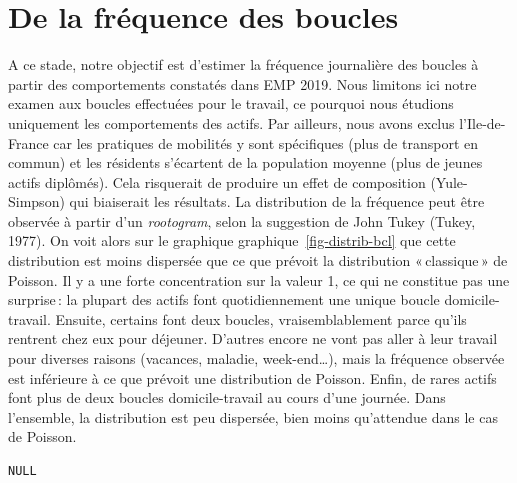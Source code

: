 \documentclass[
  9pt,
  a4paper,
  DIV=11]{scrreprt}
\begin{document}
\section{De la fréquence des
boucles}\label{de-la-fruxe9quence-des-boucles}

A ce stade, notre objectif est d'estimer la fréquence journalière des
boucles à partir des comportements constatés dans EMP 2019. Nous
limitons ici notre examen aux boucles effectuées pour le travail, ce
pourquoi nous étudions uniquement les comportements des actifs. Par
ailleurs, nous avons exclus l'Ile-de-France car les pratiques de
mobilités y sont spécifiques (plus de transport en commun) et les
résidents s'écartent de la population moyenne (plus de jeunes actifs
diplômés). Cela risquerait de produire un effet de composition
(Yule-Simpson) qui biaiserait les résultats. La distribution de la
fréquence peut être observée à partir d'un \emph{rootogram}, selon la
suggestion de John Tukey (Tukey, 1977). On voit alors sur le graphique
graphique~\ref{fig-distrib-bcl} que cette distribution est moins
dispersée que ce que prévoit la distribution «\,classique\,» de Poisson.
Il y a une forte concentration sur la valeur 1, ce qui ne constitue pas
une surprise\,: la plupart des actifs font quotidiennement une unique
boucle domicile-travail. Ensuite, certains font deux boucles,
vraisemblablement parce qu'ils rentrent chez eux pour déjeuner. D'autres
encore ne vont pas aller à leur travail pour diverses raisons (vacances,
maladie, week-end\ldots), mais la fréquence observée est inférieure à ce
que prévoit une distribution de Poisson. Enfin, de rares actifs font
plus de deux boucles domicile-travail au cours d'une journée. Dans
l'ensemble, la distribution est peu dispersée, bien moins qu'attendue
dans le cas de Poisson.

\begin{verbatim}
NULL
\end{verbatim}
\end{document}
